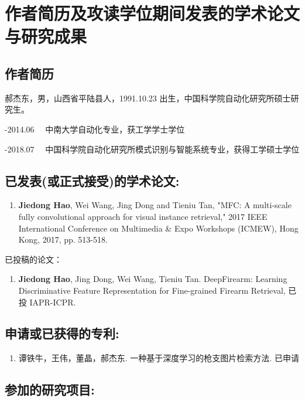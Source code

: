 
\chapter{作者简历及攻读学位期间发表的学术论文与研究成果}

\section*{作者简历}

\noindent
郝杰东，男，山西省平陆县人，1991.10.23 出生，中国科学院自动化研究所硕士研究生。

-2014.06 \ \ 中南大学自动化专业，获工学学士学位

-2018.07 \ \ 中国科学院自动化研究所模式识别与智能系统专业，获得工学硕士学位

\section*{已发表(或正式接受)的学术论文:}

\begin{enumerate}

	\item \textbf{Jiedong Hao}, Wei Wang, Jing Dong and Tieniu Tan, "MFC: A multi-scale fully convolutional approach for visual instance retrieval," 2017 IEEE International Conference on Multimedia \& Expo Workshops (ICMEW), Hong Kong, 2017, pp. 513-518.
\end{enumerate}

\noindent 已投稿的论文：

\begin{enumerate}
	\item \textbf{Jiedong Hao}, Jing Dong, Wei Wang, Tieniu Tan. DeepFirearm: Learning Discriminative Feature
Representation for Fine-grained Firearm Retrieval, 已投 IAPR-ICPR.
\end{enumerate}

\section*{申请或已获得的专利:}

\begin{enumerate}
	\item 谭铁牛，王伟，董晶，郝杰东. 一种基于深度学习的枪支图片检索方法. 已申请
\end{enumerate}

\section*{参加的研究项目:}

